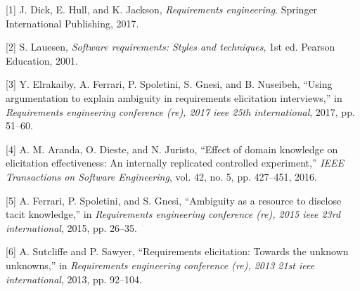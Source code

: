 \documentclass[]{llncs}
\begin{document}
\hypertarget{refs}{}
\leavevmode\hypertarget{ref-dick2017requirements}{}%
{[}1{]} J. Dick, E. Hull, and K. Jackson, \emph{Requirements
engineering}. Springer International Publishing, 2017.

\leavevmode\hypertarget{ref-lauesen2001softwarereq}{}%
{[}2{]} S. Lauesen, \emph{Software requirements: Styles and techniques},
1st ed. Pearson Education, 2001.

\leavevmode\hypertarget{ref-elrakaiby2017using}{}%
{[}3{]} Y. Elrakaiby, A. Ferrari, P. Spoletini, S. Gnesi, and B.
Nuseibeh, ``Using argumentation to explain ambiguity in requirements
elicitation interviews,'' in \emph{Requirements engineering conference
(re), 2017 ieee 25th international}, 2017, pp. 51--60.

\leavevmode\hypertarget{ref-aranda2016effect}{}%
{[}4{]} A. M. Aranda, O. Dieste, and N. Juristo, ``Effect of domain
knowledge on elicitation effectiveness: An internally replicated
controlled experiment,'' \emph{IEEE Transactions on Software
Engineering}, vol. 42, no. 5, pp. 427--451, 2016.

\leavevmode\hypertarget{ref-ferrari2015ambiguity}{}%
{[}5{]} A. Ferrari, P. Spoletini, and S. Gnesi, ``Ambiguity as a
resource to disclose tacit knowledge,'' in \emph{Requirements
engineering conference (re), 2015 ieee 23rd international}, 2015, pp.
26--35.

\leavevmode\hypertarget{ref-sutcliffe2013requirements}{}%
{[}6{]} A. Sutcliffe and P. Sawyer, ``Requirements elicitation: Towards
the unknown unknowns,'' in \emph{Requirements engineering conference
(re), 2013 21st ieee international}, 2013, pp. 92--104.
\end{document}
